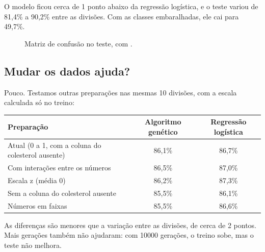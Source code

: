 \documentclass[11pt,a4paper]{article}
\newcommand{\code}[1]{\texttt{\detokenize{#1}}}
\newenvironment{tabela}{\par\nopagebreak[4]\vspace{0.3em}\nopagebreak[4]\begingroup\centering\small}{\par\endgroup\vspace{0.6em}}
\newcommand{\cmcell}[5]{%
  \pgfmathsetmacro{\intens}{8+80*(#3/#4)}%
  \pgfmathsetmacro{\escuro}{ifthenelse(\intens>62,1,0)}%
  \ifdim\escuro pt>0.5pt\def\corval{white}\else\def\corval{tinta}\fi
  \node[draw=white,line width=1.2pt,fill=azul!\intens,minimum width=#5 cm,minimum height=#5 cm,
    inner sep=0pt,text=\corval,font=\small] at (#1*#5,-#2*#5) {#3};}
\begin{document}
O modelo ficou cerca de 1 ponto abaixo da regressão logística, e o teste variou de 81,4\% a 90,2\% entre as divisões. Com as classes embaralhadas, ele cai para 49,7\%.

\begin{figure}[H]
\centering
{}
\caption{Matriz de confusão no teste, com \code{seed=0}.}
\end{figure}

\subsection{Mudar os dados ajuda?}

Pouco. Testamos outras preparações nas mesmas 10 divisões, com a escala calculada só no treino:

\begin{tabela}
\begin{tabular}{lcc}
\toprule
Preparação & Algoritmo genético & Regressão logística\\
\midrule
Atual (0 a 1, com a coluna do colesterol ausente) & 86,1\% & 86,7\%\\
Com interações entre os números & 86,5\% & 87,0\%\\
Escala z (média 0) & 86,2\% & 87,3\%\\
Sem a coluna do colesterol ausente & 85,5\% & 86,1\%\\
Números em faixas & 85,5\% & 86,6\%\\
\bottomrule
\end{tabular}
\end{tabela}

As diferenças são menores que a variação entre as divisões, de cerca de 2 pontos. Mais gerações também não ajudaram: com 10000 gerações, o treino sobe, mas o teste não melhora.
\end{document}

